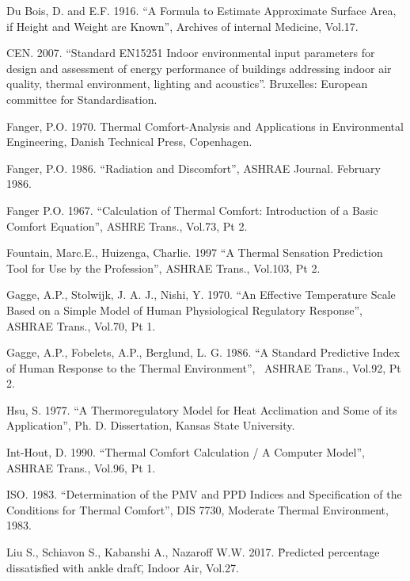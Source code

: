 Du Bois, D. and E.F. 1916. ``A Formula to Estimate Approximate Surface Area, if Height and Weight are Known'', Archives of internal Medicine, Vol.17.

CEN. 2007. ``Standard EN15251 Indoor environmental input parameters for design and assessment of energy performance of buildings addressing indoor air quality, thermal environment, lighting and acoustics''. Bruxelles: European committee for Standardisation.

Fanger, P.O. 1970. Thermal Comfort-Analysis and Applications in Environmental Engineering, Danish Technical Press, Copenhagen.

Fanger, P.O. 1986. ``Radiation and Discomfort'', ASHRAE Journal. February 1986.

Fanger P.O. 1967. ``Calculation of Thermal Comfort: Introduction of a Basic Comfort Equation'', ASHRE Trans., Vol.73, Pt 2.

Fountain, Marc.E., Huizenga, Charlie. 1997 ``A Thermal Sensation Prediction Tool for Use by the Profession'', ASHRAE Trans., Vol.103, Pt 2.

Gagge, A.P., Stolwijk, J. A. J., Nishi, Y. 1970. ``An Effective Temperature Scale Based on a Simple Model of Human Physiological Regulatory Response'', ASHRAE Trans., Vol.70, Pt 1.

Gagge, A.P., Fobelets, A.P., Berglund, L. G. 1986. ``A Standard Predictive Index of Human Response to the Thermal Environment'',~ ASHRAE Trans., Vol.92, Pt 2.

Hsu, S. 1977. ``A Thermoregulatory Model for Heat Acclimation and Some of its Application'', Ph. D. Dissertation, Kansas State University.

Int-Hout, D. 1990. ``Thermal Comfort Calculation / A Computer Model'', ASHRAE Trans., Vol.96, Pt 1.

ISO. 1983. ``Determination of the PMV and PPD Indices and Specification of the Conditions for Thermal Comfort'', DIS 7730, Moderate Thermal Environment, 1983.

Liu S., Schiavon S., Kabanshi A., Nazaroff W.W. 2017. \"Predicted percentage dissatisfied with ankle draft\", Indoor Air, Vol.27.
